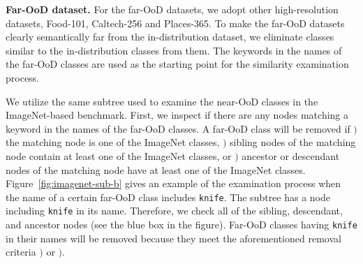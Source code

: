 \documentclass[preprint,12pt]{elsarticle}
\begin{document}
\textbf{Far-OoD dataset.}
For the far-OoD datasets, we adopt other high-resolution datasets, Food-101, Caltech-256 and Places-365. To make the far-OoD datasets clearly semantically far from the in-distribution dataset, we eliminate classes similar to the in-distribution classes from them. The keywords in the names of the far-OoD classes are used as the starting point for the similarity examination process.

We utilize the same subtree used to examine the near-OoD classes in the ImageNet-based benchmark. First, we inspect if there are any nodes matching a keyword in the names of the far-OoD classes. A far-OoD class will be removed if  $)$ the matching node is one of the ImageNet classes,  $)$ sibling nodes of the matching node contain at least one of the ImageNet classes, or  $)$ ancestor or descendant nodes of the matching node have at least one of the ImageNet classes.
Figure~\ref{fig:imagenet-sub-b} gives an example of the examination process when the name of a certain far-OoD class includes \texttt{knife}. The subtree has a node including \texttt{knife} in its name. Therefore, we check all of the sibling, descendant, and ancestor nodes (see the blue box in the figure). Far-OoD classes having \texttt{knife} in their names will be removed because they meet the aforementioned removal criteria  $)$ or  $)$.
\end{document}
